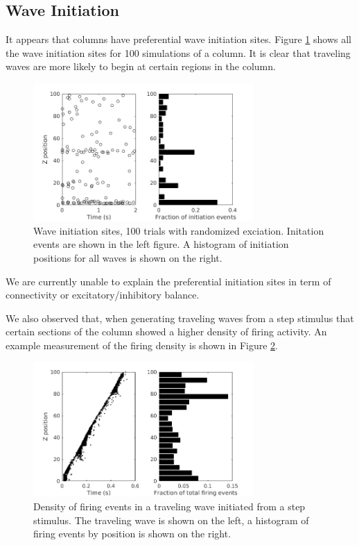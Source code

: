 \documentclass[a4paper,11pt]{article}
\begin{document}
\subsection{Wave Initiation} \label{sub:wave_initiation}
It appears that columns have preferential wave initiation sites.
Figure \ref{fig:wave_initiation} shows all the wave initiation sites for 100 simulations of a column.
It is clear that traveling waves are more likely to begin at certain regions in the column.
\begin{figure}[!htb]
 \caption{Wave initiation sites, 100 trials with randomized exciation. Initation events are shown in the left figure. A histogram of initiation positions for all waves is shown on the right.}
 \label{fig:wave_initiation}
 \centering
   \includegraphics[width=0.75\textwidth]{fig/InitiationSites_100sims}
\end{figure}
We are currently unable to explain the preferential initiation sites in term of connectivity or excitatory/inhibitory balance. 

We also observed that, when generating traveling waves from a step stimulus that certain sections of the column showed a higher density of firing activity.
An example measurement of the firing density is shown in Figure \ref{fig:wave_density}.
\begin{figure}[!htb]
 \caption{Density of firing events in a traveling wave initiated from a step stimulus. The traveling wave is shown on the left, a histogram of firing events by position is shown on the right.}
 \label{fig:wave_density}
 \centering
   \includegraphics[width=0.75\textwidth]{fig/ImpulseWaveDensity}
\end{figure}
\end{document}
